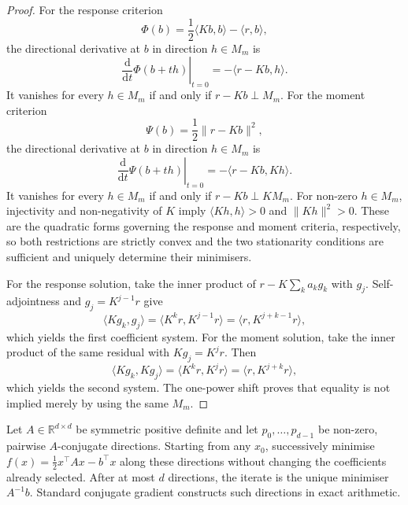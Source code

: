 \begin{proof}
For the response criterion
\[
    \Phi(b)=\frac12\langle Kb,b\rangle-\langle r,b\rangle,
\]
the directional derivative at $b$ in direction $h\in M_m$ is
\[
    \left.\frac{\mathrm d}{\mathrm dt}\Phi(b+th)\right|_{t=0}
    =-\langle r-Kb,h\rangle.
\]
It vanishes for every $h\in M_m$ if and only if
$r-Kb\perp M_m$.  For the moment criterion
\[
    \Psi(b)=\frac12\|r-Kb\|^2,
\]
the directional derivative at $b$ in direction $h\in M_m$ is
\[
    \left.\frac{\mathrm d}{\mathrm dt}\Psi(b+th)\right|_{t=0}
    =-\langle r-Kb,Kh\rangle.
\]
It vanishes for every $h\in M_m$ if and only if
$r-Kb\perp KM_m$.  For non-zero $h\in M_m$, injectivity and
non-negativity of $K$ imply $\langle Kh,h\rangle>0$ and
$\|Kh\|^2>0$.  These are the quadratic forms governing the response and
moment criteria, respectively, so both restrictions are strictly convex and
the two stationarity conditions are sufficient and uniquely determine their
minimisers.

For the response solution, take the inner product of
$r-K\sum_k a_kg_k$ with $g_j$.  Self-adjointness and
$g_j=K^{j-1}r$ give
\[
 \langle Kg_k,g_j\rangle
 =\langle K^kr,K^{j-1}r\rangle
 =\langle r,K^{j+k-1}r\rangle,
\]
which yields the first coefficient system.  For the moment solution, take
the inner product of the same residual with $Kg_j=K^jr$.  Then
\[
 \langle Kg_k,Kg_j\rangle
 =\langle K^kr,K^jr\rangle
 =\langle r,K^{j+k}r\rangle,
\]
which yields the second system.  The one-power shift proves that equality is
not implied merely by using the same $M_m$.
\end{proof}

\begin{proposition}
\label{prop:app-conjugate-direction-termination}
Let $A\in\mathbb R^{d\times d}$ be symmetric positive definite and let
$p_0,\ldots,p_{d-1}$ be non-zero, pairwise $A$-conjugate directions.  Starting
from any $x_0$, successively minimise
$f(x)=\frac12x^\top Ax-b^\top x$ along these directions without changing
the coefficients already selected.  After at most $d$ directions, the
iterate is the unique minimiser $A^{-1}b$.  Standard conjugate gradient
constructs such directions in exact arithmetic.
\end{proposition}

